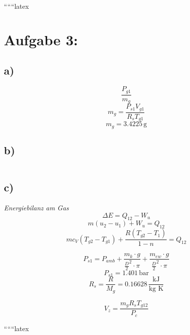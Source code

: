 
``````latex


\section*{Aufgabe 3:}

\subsection*{a)}
\[
\frac{P_{g1}}{m_g}
\]
\[
m_g = \frac{P_{s1} V_{g1}}{R_s T_{g1}}
\]
\[
m_g = 3.4225 \, \text{g}
\]

\subsection*{b)}
\[
\]

\subsection*{c)}
\textit{Energiebilanz am Gas}
\[
\Delta E = Q_{12} - W_u
\]
\[
m(u_2 - u_1) + W_u = Q_{12}
\]
\[
m c_V (T_{g2} - T_{g1}) + \frac{R (T_{g2} - T_1)}{1 - n} = Q_{12}
\]

\[
P_{s1} = P_{amb} + \frac{m_k \cdot g}{\frac{D}{2}^2 \cdot \pi} + \frac{m_{ew} \cdot g}{\frac{D}{2}^2 \cdot \pi}
\]
\[
P_{s1} = 1.401 \, \text{bar}
\]
\[
R_s = \frac{R}{M_g} = 0.16628 \, \frac{\text{kJ}}{\text{kg K}}
\]

\[
V_z = \frac{m_g R_s T_{g12}}{P_{c}}
\]

``````latex


